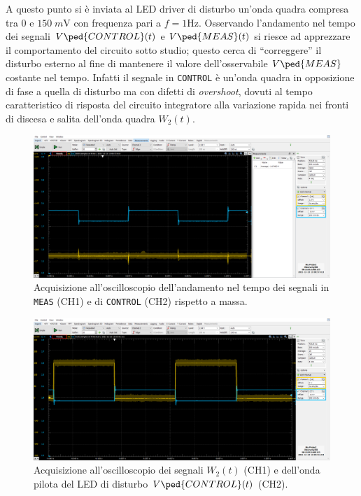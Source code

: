 \documentclass[10pt, a4paper, italian]{article}
\begin{document}
A questo punto si è inviata al LED driver di disturbo un'onda quadra compresa
tra $0$ e $150 \; \si{m\V}$ con frequenza pari a $f = 1 \si{\Hz}$.
Osservando l'andamento nel tempo dei segnali $V\ped{CONTROL} (t)$ e
$V\ped{MEAS} (t)$ si riesce ad apprezzare il comportamento del circuito sotto
studio; questo cerca di ``correggere'' il disturbo esterno al fine di
mantenere il valore dell'osservabile $V\ped{MEAS}$ costante nel tempo.
Infatti il segnale in \verb+CONTROL+ è un'onda quadra in opposizione di fase
a quella di disturbo ma con difetti di \emph{overshoot}, dovuti al tempo
caratteristico di risposta del circuito integratore alla variazione rapida
nei fronti di discesa e salita dell'onda quadra $W_2 (t)$.
\begin{figure}[htbp]
    \centering
	\includegraphics[width=\textwidth]{control7.meas}
    \caption{Acquisizione all'oscilloscopio dell'andamento nel tempo dei
    segnali in \texttt{MEAS} (CH1) e di \texttt{CONTROL} (CH2) rispetto a
    massa.
    \label{fig: ctrlmeas}}
\end{figure}
\begin{figure}[htbp]
    \centering
	\includegraphics[width=\textwidth]{control7}
    \caption{Acquisizione all'oscilloscopio dei segnali $W_2 (t)$
    (CH1) e dell'onda pilota del LED di disturbo $V\ped{CONTROL} (t)$ (CH2).
    \label{fig: ctrlnoise}}
\end{figure}
\end{document}
